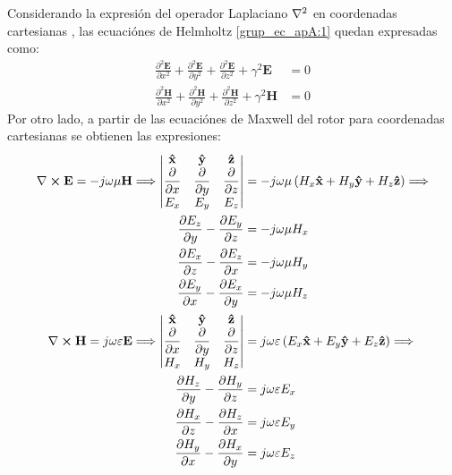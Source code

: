 Considerando la expresión del operador Laplaciano $\nabla^2\mathbf{}$ en coordenadas cartesianas \cite{walfram_car_coord}, las ecuaciónes de Helmholtz \eqref{grup_ec_apA:1} quedan expresadas como:
\begin{subequations}
\label{grup_ec_apA:2}
\begin{align}
\frac{\partial ^2\mathbf{E}}{\partial x^2} + \frac{\partial ^2\mathbf{E}}{\partial y^2} +  \frac{\partial ^2\mathbf{E}}{\partial z^2} + \gamma ^2\mathbf{E} &= 0
\label{ec_apA:9}\\
\frac{\partial ^2\mathbf{H}}{\partial x^2} + \frac{\partial ^2\mathbf{H}}{\partial y^2} +  \frac{\partial ^2\mathbf{H}}{\partial z^2} + \gamma ^2\mathbf{H} &= 0
\label{ec_apA:10}
\end{align}
\end{subequations}
Por otro lado, a partir de las ecuaciónes de Maxwell del rotor para coordenadas cartesianas \cite{walfram_car_coord} se obtienen las expresiones:
\begin{subequations}
\label{grup_ec_apA:3}
\begin{align}
\nabla\boldsymbol{\times}\mathbf{E} = -j\omega{\mu}\mathbf{H}\Longrightarrow
\begin{vmatrix}
\bm{\mathbf{\hat{x}}} & \bm{\mathbf{\hat{y}}} & \bm{\mathbf{\hat{z}}}\\
\dfrac{\partial}{\partial x} &\dfrac{\partial}{\partial y} &\dfrac{\partial}{\partial z}\\
E_x & E_y & E_z\\
\end{vmatrix}
&= - j\omega{\mu}\left(H_x\bm{\mathbf{\hat{x}}} + H_y\bm{\mathbf{\hat{y}}} + H_z\bm{\mathbf{\hat{z}}}\right)\Longrightarrow\notag\\
\frac{\partial E_z}{\partial y} - \frac{\partial E_y}{\partial z}  &= -j\omega{\mu}H_x
\label{ec_apA:11}\\
\frac{\partial E_x}{\partial z} - \frac{\partial E_z}{\partial x}  &= -j\omega{\mu}H_y
\label{ec_apA:12}\\
\frac{\partial E_y}{\partial x} - \frac{\partial E_x}{\partial y}  &= -j\omega{\mu}H_z
\label{ec_apA:13}\\
\nabla\boldsymbol{\times}\mathbf{H} = j\omega{\varepsilon}\mathbf{E}\Longrightarrow
\begin{vmatrix}
\bm{\mathbf{\hat{x}}} & \bm{\mathbf{\hat{y}}} & \bm{\mathbf{\hat{z}}}\\
\dfrac{\partial}{\partial x} &\dfrac{\partial}{\partial y} &\dfrac{\partial}{\partial z}\\
H_x & H_y & H_z\\
\end{vmatrix}
&= j\omega{\varepsilon}\left(E_x\bm{\mathbf{\hat{x}}} + E_y\bm{\mathbf{\hat{y}}} + E_z\bm{\mathbf{\hat{z}}}\right)\Longrightarrow\notag\\
\frac{\partial H_z}{\partial y} - \frac{\partial H_y}{\partial z}  &= j\omega{\varepsilon}E_x
\label{ec_apA:14}\\
\frac{\partial H_x}{\partial z} - \frac{\partial H_z}{\partial x}  &= j\omega{\varepsilon}E_y
\label{ec_apA:15}\\
\frac{\partial H_y}{\partial x} - \frac{\partial H_x}{\partial y}  &= j\omega{\varepsilon}E_z
\label{ec_apA:16}
\end{align}
\end{subequations}
